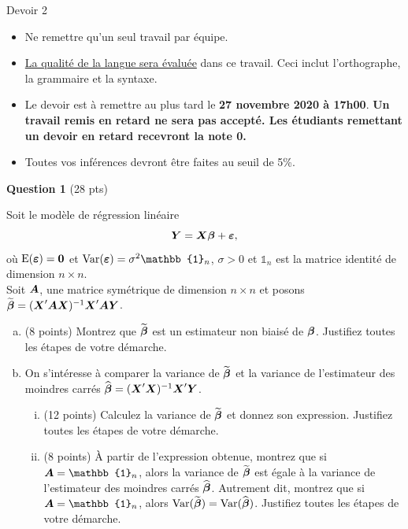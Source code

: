 \documentclass[letter, 11pt]{article}
\newcommand{\bm}{\boldmath}
\newcommand{\um}{\unboldmath}
\newcommand{\boY}{\mbox{\bm$Y$\um}}
\newcommand{\bobeta}{\mbox{\bm$\beta$}}
\newcommand{\boeps}{\mbox{\bm$\varepsilon$\um}}
\newcommand{\bo}[1]{\mbox{\bm$#1$\um}}
\begin{document}
\begin{center}
{\Large Devoir 2 }
\end{center}
\vspace*{0.1 in}

\begin{itemize}
\item Ne remettre qu'un seul travail par équipe.
\item \underline{La qualité de la langue sera évaluée} dans ce travail. Ceci inclut l'orthographe, la grammaire et la syntaxe.
\item Le devoir est à remettre au plus tard le {\bf 27 novembre 2020 à 17h00}. {\bf Un travail remis en retard ne sera pas accepté. Les étudiants remettant un devoir en retard recevront la note 0.}
\item Toutes vos inférences devront être faites au seuil de 5\%.
\end{itemize}

\vspace{0.2 in}
\textbf{Question 1} (28 pts)
\vspace{0.1in}

Soit le mod\`ele de r\'egression lin\'eaire 
$$\boY=\bo{X}\bobeta+\boeps,$$
o\`u $\mathrm{E}(\boeps) = {\bf 0}$ et $\mathrm{Var}(\boeps)=\sigma^2 \mathbb{1}_n $, $\sigma>0$ et $\mathbb{1}_n$ est la
matrice identit\'e de dimension $n\times n$.\\

Soit $\bo{A}$, une matrice sym\'etrique de dimension $n\times n$ et posons $\widetilde{\bobeta}=(\bo{X}'\bo{A}\bo{X})^{-1}\bo{X}'\bo{A}\boY$.

\begin{enumerate}[(a)]
	\item (8 points) Montrez que $\widetilde{\bobeta}$ est un estimateur non biais\'e de $\bobeta$. Justifiez toutes les étapes de votre démarche.
	\item On s'intéresse à comparer la variance de  $\widetilde{\bobeta}$ et la variance de l'estimateur des moindres carrés $\widehat{\bobeta}=(\bo{X}'\bo{X})^{-1}\bo{X}'\boY$. 
		\begin{enumerate}[(i)]
		\item (12 points) Calculez la variance de $\widetilde{\bobeta}$ et donnez son expression. Justifiez toutes les étapes de votre démarche.
		\item (8 points) À partir de l'expression obtenue, montrez que si $\bo{A} = \mathbb{1}_n$, alors la variance de $\widetilde{\bobeta}$ est égale à la variance de l'estimateur des moindres carrés $\widehat{\bobeta}$. Autrement dit, montrez que si $\bo{A} = \mathbb{1}_n$, alors $\mathrm{Var}(\widetilde{\bobeta}) = \mathrm{Var}(\widehat{\bobeta})$. Justifiez toutes les étapes de votre démarche.
		\end{enumerate}
\end{enumerate}
\end{document}
